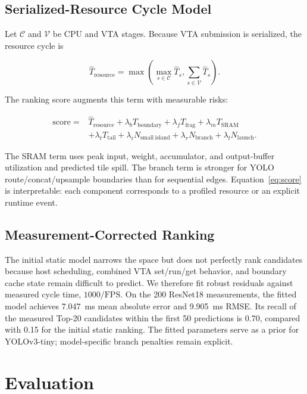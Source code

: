 \documentclass[conference]{IEEEtran}
\begin{document}
\subsection{Serialized-Resource Cycle Model}

Let $\mathcal{C}$ and $\mathcal{V}$ be CPU and VTA stages. Because VTA submission is serialized, the resource cycle is

\begin{equation}
\widehat{T}_{\mathrm{resource}}=
\max\left(\max_{s\in\mathcal{C}}\widehat{T}_s,
\sum_{s\in\mathcal{V}}\widehat{T}_s\right).
\label{eq:resource}
\end{equation}

The ranking score augments this term with measurable risks:

\begin{align}
\mathrm{score} ={}&\widehat{T}_{\mathrm{resource}}
+\lambda_b T_{\mathrm{boundary}}+\lambda_f T_{\mathrm{frag}}
+\lambda_m T_{\mathrm{SRAM}}\nonumber\\
&+\lambda_t T_{\mathrm{tail}}+\lambda_i N_{\mathrm{small\ island}}
+\lambda_r N_{\mathrm{branch}}+\lambda_l N_{\mathrm{launch}}.
\label{eq:score}
\end{align}

The SRAM term uses peak input, weight, accumulator, and output-buffer utilization and predicted tile spill. The branch term is stronger for YOLO route/concat/upsample boundaries than for sequential edges. Equation~\eqref{eq:score} is interpretable: each component corresponds to a profiled resource or an explicit runtime event.

\subsection{Measurement-Corrected Ranking}

The initial static model narrows the space but does not perfectly rank candidates because host scheduling, combined VTA set/run/get behavior, and boundary cache state remain difficult to predict. We therefore fit robust residuals against measured cycle time, $1000/\mathrm{FPS}$. On the 200 ResNet18 measurements, the fitted model achieves 7.047~ms mean absolute error and 9.905~ms RMSE. Its recall of the measured Top-20 candidates within the first 50 predictions is 0.70, compared with 0.15 for the initial static ranking. The fitted parameters serve as a prior for YOLOv3-tiny; model-specific branch penalties remain explicit.

\section{Evaluation}
\end{document}
